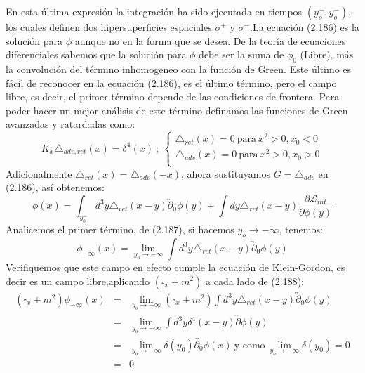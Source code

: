 En esta última expresión la integración ha sido ejecutada en tiempos $(y_{o}^{+},y_{o}^{-})$, los cuales definen dos hipersuperficies espaciales $\sigma^+$ y $\sigma^-$.La ecuación (2.186) es la solución para $\phi$ aunque no en la forma que se desea. De la teoría de ecuaciones diferenciales sabemos que la solución para $\phi$ debe ser la suma de $\phi_0$ (Libre), más la convolución del término inhomogeneo con la función de Green. Este último es fácil de reconocer en la ecuación (2.186), es el último término, pero el campo libre, es decir, el primer término depende de las condiciones de frontera.  Para poder hacer un mejor análisis de este término definamos las funciones de Green avanzadas y ratardadas como:
\[   K_x\triangle_{adv,ret}(x)=\delta^4(x)\ ;\
     \begin{cases}
       \triangle_{ret}(x)=0\  \text{para}\ x^2>0,x_0<0\\
       \triangle_{adv}(x)=0\  \text{para}\ x^2>0,x_0>0 \\
      
     \end{cases}
\]
Adicionalmente $\triangle_{ret}(x)=\triangle_{adv}(-x)$, ahora sustituyamos $G=\triangle_{adv}$ en (2.186), así obtenemos:
\begin{equation}
\phi(x)=\int_{y_{0}^{-}}d^{3}y\triangle_{ret}(x-y)\overleftrightarrow{\partial}_{0}\phi(y)+\int dy\triangle_{ret}(x-y)\frac{\partial\mathcal{L}_{int}}{\partial\phi(y)}
\end{equation}
Analicemos el primer término, de (2.187), si hacemos $y_o\to -\infty$, tenemos:
\begin{equation}
\phi_{-\infty}(x)=\lim_{y_{o}\to-\infty}\int d^{3}y\triangle_{ret}(x-y)\overleftrightarrow{\partial}_{0}\phi(y)
\end{equation}
Verifiquemos que este campo en efecto cumple la ecuación de Klein-Gordon, es decir es un campo libre,aplicando $(\square_x +m^2)$ a cada lado de (2.188):
\begin{eqnarray}
\nonumber (\square_{x}+m^{2})\phi_{-\infty}(x)&=&\lim_{y_{o}\to-\infty}(\square_{x}+m^{2})\int d^{3}y\triangle_{ret}(x-y)\overleftrightarrow{\partial}_{0}\phi(y)\\
\nonumber &=&\lim_{y_{o}\to-\infty}\int d^{3}y\delta^{4}(x-y)\overleftrightarrow{\partial}\phi(y)\\
\nonumber &=& \lim_{y_{o}\to-\infty}\delta(y_{0})\overleftrightarrow{\partial_{0}}\phi(x)\ \text{y como}\ \lim_{y_{o}\to-\infty}\delta(y_{0})=0\\
&=&0
\end{eqnarray}
